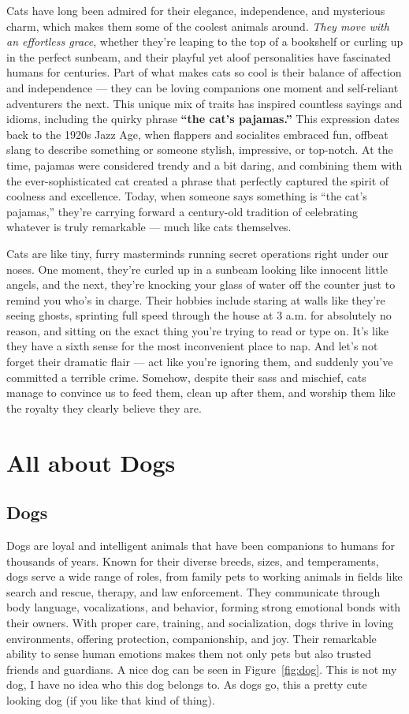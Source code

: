 \documentclass[11pt,a4paper]{report}
\begin{document}
Cats have long been admired for their elegance, independence, and mysterious charm, which makes them some of the coolest animals around. \emph{They move with an effortless grace}, whether they’re leaping to the top of a bookshelf or curling up in the perfect sunbeam, and their playful yet aloof personalities have fascinated humans for centuries. Part of what makes cats so cool is their balance of affection and independence — they can be loving companions one moment and self-reliant adventurers the next. This unique mix of traits has inspired countless sayings and idioms, including the quirky phrase \textbf{“the cat’s pajamas.”} This expression dates back to the 1920s Jazz Age, when flappers and socialites embraced fun, offbeat slang to describe something or someone stylish, impressive, or top-notch. At the time, pajamas were considered trendy and a bit daring, and combining them with the ever-sophisticated cat created a phrase that perfectly captured the spirit of coolness and excellence. Today, when someone says something is “the cat’s pajamas,” they’re carrying forward a century-old tradition of celebrating whatever is truly remarkable — much like cats themselves.

Cats are like tiny, furry masterminds running secret operations right under our noses. One moment, they’re curled up in a sunbeam looking like innocent little angels, and the next, they’re knocking your glass of water off the counter just to remind you who’s in charge. Their hobbies include staring at walls like they’re seeing ghosts, sprinting full speed through the house at 3 a.m. for absolutely no reason, and sitting on the exact thing you’re trying to read or type on. It’s like they have a sixth sense for the most inconvenient place to nap. And let’s not forget their dramatic flair — act like you’re ignoring them, and suddenly you’ve committed a terrible crime. Somehow, despite their sass and mischief, cats manage to convince us to feed them, clean up after them, and worship them like the royalty they clearly believe they are.

\chapter{All about Dogs}
\section{Dogs}

Dogs are loyal and intelligent animals that have been companions to humans for thousands of years. Known for their diverse breeds, sizes, and temperaments, dogs serve a wide range of roles, from family pets to working animals in fields like search and rescue, therapy, and law enforcement. They communicate through body language, vocalizations, and behavior, forming strong emotional bonds with their owners. With proper care, training, and socialization, dogs thrive in loving environments, offering protection, companionship, and joy. Their remarkable ability to sense human emotions makes them not only pets but also trusted friends and guardians. A nice dog can be seen in Figure~\ref{fig:dog}. This is not my dog, I have no idea who this dog belongs to. As dogs go, this a pretty cute looking dog (if you like that kind of thing).
\end{document}
